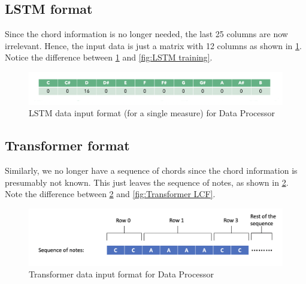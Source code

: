   \subsection{LSTM format}
Since the chord information is no longer needed, the last 25 columns are now irrelevant. Hence, the input data is just a matrix with 12 columns as shown in \cref{fig:LSTM data processor}. Notice the difference between \cref{fig:LSTM data processor} and \cref{fig:LSTM training}.

\begin{figure}
    \centering
    \includegraphics[scale=0.3]{Figures/LSTM data processor}
    \decoRule
    \caption{LSTM data input format (for a single measure) for Data Processor}
    \label{fig:LSTM data processor}
    \end{figure}

\subsection{Transformer format}
Similarly, we no longer have a sequence of chords since the chord information is presumably not known. This just leaves the sequence of notes, as shown in \cref{fig:Transformer data processor}. Note the difference between \cref{fig:Transformer data processor} and \cref{fig:Transformer LCF}.

\begin{figure}
    \centering
    \includegraphics[scale=0.3]{Figures/Transformer data processor}
    \decoRule
    \caption{Transformer data input format for Data Processor}
    \label{fig:Transformer data processor}
    \end{figure}

